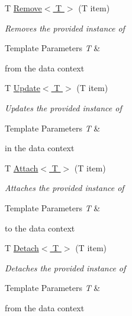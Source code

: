 \begin{DoxyCompactItemize}
\item 
T \hyperlink{class_framework_extension_1_1_entity_framework_1_1_tests_1_1_unit_tests_1_1_e_f_failure_context_a2a577ce94c9ea67d1f3d255c3f4aa9d8}{Remove$<$ T $>$} (T item)
\begin{DoxyCompactList}\small\item\em Removes the provided instance of 
\begin{DoxyTemplParams}{Template Parameters}
{\em T} & \\
\hline
\end{DoxyTemplParams}
from the data context \end{DoxyCompactList}\item 
T \hyperlink{class_framework_extension_1_1_entity_framework_1_1_tests_1_1_unit_tests_1_1_e_f_failure_context_a784fd14d08113d264b8bf40d57a54b34}{Update$<$ T $>$} (T item)
\begin{DoxyCompactList}\small\item\em Updates the provided instance of 
\begin{DoxyTemplParams}{Template Parameters}
{\em T} & \\
\hline
\end{DoxyTemplParams}
in the data context \end{DoxyCompactList}\item 
T \hyperlink{class_framework_extension_1_1_entity_framework_1_1_tests_1_1_unit_tests_1_1_e_f_failure_context_a08e5c8cc89f1409bf58fce39d097935c}{Attach$<$ T $>$} (T item)
\begin{DoxyCompactList}\small\item\em Attaches the provided instance of 
\begin{DoxyTemplParams}{Template Parameters}
{\em T} & \\
\hline
\end{DoxyTemplParams}
to the data context \end{DoxyCompactList}\item 
T \hyperlink{class_framework_extension_1_1_entity_framework_1_1_tests_1_1_unit_tests_1_1_e_f_failure_context_aa33403a155b2131363fa93932d4c89f8}{Detach$<$ T $>$} (T item)
\begin{DoxyCompactList}\small\item\em Detaches the provided instance of 
\begin{DoxyTemplParams}{Template Parameters}
{\em T} & \\
\hline
\end{DoxyTemplParams}
from the data context \end{DoxyCompactList}\item 

\end{DoxyCompactItemize}

